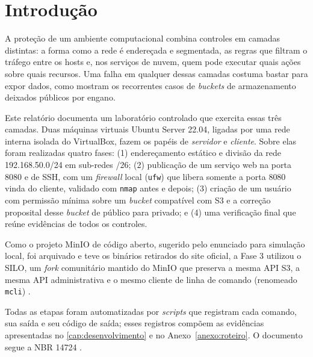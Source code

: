 \chapter{Introdução}

A proteção de um ambiente computacional combina controles em camadas distintas: a
forma como a rede é endereçada e segmentada, as regras que filtram o tráfego entre os
hosts e, nos serviços de nuvem, quem pode executar quais ações sobre quais recursos. Uma
falha em qualquer dessas camadas costuma bastar para expor dados, como mostram os
recorrentes casos de \textit{buckets} de armazenamento deixados públicos por engano.

Este relatório documenta um laboratório controlado que exercita essas três camadas. Duas
máquinas virtuais Ubuntu Server 22.04, ligadas por uma rede interna isolada do VirtualBox,
fazem os papéis de \emph{servidor} e \emph{cliente}. Sobre elas foram realizadas quatro
fases: (1) endereçamento estático e divisão da rede 192.168.50.0/24 em sub-redes /26;
(2) publicação de um serviço web na porta 8080 e de SSH, com um \textit{firewall} local
(\texttt{ufw}) que libera somente a porta 8080 vinda do cliente, validado com
\texttt{nmap} antes e depois; (3) criação de um usuário com permissão mínima sobre um
\textit{bucket} compatível com S3 e a correção proposital desse \textit{bucket} de público
para privado; e (4) uma verificação final que reúne evidências de todos os controles.

Como o projeto MinIO de código aberto, sugerido pelo enunciado para simulação local, foi
arquivado e teve os binários retirados do site oficial, a Fase 3 utilizou o SILO, um
\textit{fork} comunitário mantido do MinIO que preserva a mesma API S3, a mesma API
administrativa e o mesmo cliente de linha de comando (renomeado \texttt{mcli})
\cite{silo-docs,minio-arquivado}.

Todas as etapas foram automatizadas por \textit{scripts} que registram cada comando,
sua saída e seu código de saída; esses registros compõem as evidências apresentadas no
\autoref{cap:desenvolvimento} e no Anexo~\ref{anexo:roteiro}. O documento segue a
NBR 14724 \cite{abnt14724}.
